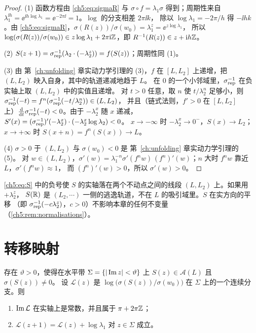 \begin{proof}
(1) 函数方程由 \eqref{ch5:eq:sigmaR} 与 $\sigma\circ f=\lambda_1\sigma$ 得到；周期性来自
$\lambda_1^{\ii h}=\ee^{\ii h\log\lambda_1}=\ee^{-2\pi\ii}=1$。$\log$ 的分支相差 $2\pi\ii k$，
除以 $\log\lambda_1=-2\pi/h$ 得 $-\ii hk$。由 \eqref{ch5:eq:sigmaR}，$\sigma(R(z))/\sigma(w_0)=\lambda_1^z=\ee^{z\log\lambda_1}$，
所以 $\log(\sigma(R(z))/\sigma(w_0))\in z\log\lambda_1+2\pi\mathrm{i}\mathbb{Z}$，即 $R^{-1}(R(z))\in z+\mathrm{i} h\mathbb{Z}$。

(2) $S(z+1)=\sigma_{\rm rep}^{-1}(\lambda_2\cdot(-\lambda_2^z))=f(S(z))$；周期性同 (1)。

(3) 由 第~\ref{ch:unfolding} 章实动力学引理的 (3)，$f$ 在 $[L,L_2]$ 上递增，把 $(L,L_2)$ 映入自身，其中的轨道递减地趋于 $L$。
在 $0$ 的一个小邻域里，$\sigma_{\rm rep}^{-1}$ 在负实轴上取 $(L,L_2)$ 中的实值且递增。
对 $t>0$ 任意，取 $n$ 使 $t/\lambda_2^n$ 足够小，则 $\sigma_{\rm rep}^{-1}(-t)=f^n(\sigma_{\rm rep}^{-1}(-t/\lambda_2^n))\in(L,L_2)$，
并且（链式法则，$f'>0$ 在 $[L,L_2]$ 上）$\frac{\mathrm{d}}{\mathrm{d} t}\sigma_{\rm rep}^{-1}(-t)<0$。由于 $-\lambda_2^x$ 随 $x$ 递减，
$S'(x)=(\sigma_{\rm rep}^{-1})'(-\lambda_2^x)\cdot(-\lambda_2^x\log\lambda_2)<0$。
$x\to-\infty$ 时 $-\lambda_2^x\to0^-$，$S(x)\to L_2$；$x\to+\infty$ 时 $S(x+n)=f^n(S(x))\to L$。

(4) $\sigma>0$ 于 $(L,L_2)$ 与 $\sigma(w_0)<0$ 是 第~\ref{ch:unfolding} 章实动力学引理的 (5)。
对 $w\in(L,L_2)$，$\sigma'(w)=\lambda_1^{-n}\sigma'(f^nw)\,(f^n)'(w)$；$n$ 大时 $f^nw$ 靠近 $L$，$\sigma'(f^nw)\approx1$，
而 $(f^n)'(w)>0$，所以 $\sigma'(w)>0$。
\end{proof}

\begin{remark}[负号的作用]\label{ch5:rem:sign}
\eqref{ch5:eq:S} 中的负号使 $S$ 的实轴落在两个不动点之间的线段 $(L,L_2)$ 上。如果用 $+\lambda_2^z$，
$S(\mathbb{R})$ 是 $(L_2,\cdots)$ 一侧的逃逸轨道，不在 $L$ 的吸引域里。$S$ 在实方向的平移
（即 $\sigma_{\rm rep}^{-1}(-c\lambda_2^z)$，$c>0$）不影响本章的任何不变量（\cref{ch5:rem:normalisations}）。
\end{remark}

\section{转移映射}\label{ch5:sec:T}

\begin{lemma}[转移映射的定义域]\label{ch5:lem:strip}
存在 $\vartheta>0$，使得在水平带 $\Sigma=\{|\operatorname{Im} z|<\vartheta\}$ 上 $S(z)\in\mathcal A(L)$ 且 $\sigma(S(z))\ne0$。
设 $\mathcal L(z)$ 是 $\log\bigl(\sigma(S(z))/\sigma(w_0)\bigr)$ 在 $\Sigma$ 上的一个连续分支。则
\begin{enumerate}
\item $\operatorname{Im}\mathcal L$ 在实轴上是常数，并且属于 $\pi+2\pi\mathbb{Z}$；
\item $\mathcal L(z+1)=\mathcal L(z)+\log\lambda_1$ 对 $z\in\Sigma$ 成立。
\end{enumerate}
\end{lemma}

